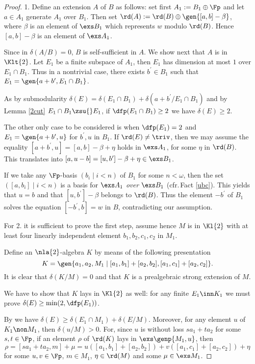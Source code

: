 \begin{proof}
1. Define an extension $A$ of $B$ as follows: set first $A_{1}:=B_{1}\oplus\Fp$ and let $a\in A_{1}$ generate $A_{1}$ over $B_{1}$.
Then set $\rd(A):=\rd(B)\oplus\gen{[a,b]-\beta}$, where
$\beta$ is an element of $\exs B_{1}$ which represents $w$ modulo
$\rd(B)$. Hence $[a,b]-\beta$ is an element of $\exs A_{1}$.

Since in $\delta(A/B)=0$, $B$ is self-sufficient in $A$. We show
next that $A$ is in $\Klt{2}$. Let $E_{1}$ be a finite subspace of $A_{1}$,
then $E_{1}$ has dimension at most $1$ over $E_{1}\cap B_{1}$. Thus in a nontrivial
case, there exists $b^{\prime}\in B_{1}$ such that $E_{1}=\gen{a+b^{\prime},E_{1}\cap B_{1}}$.

As by submodularity  $\delta(E)=\delta(E_{1}\cap B_{1})+\delta(a+b^{\prime}/ E_{1}\cap B_{1})$ and by Lemma \ref{2cut}
$E_{1}\cap B_{1}\zsu{}E_{1}$, if $\dfp(E_{1}\cap B_{1})\geq2$ we have $\delta(E)\geq2$.

The other only case to be considered is when $\dfp(E_{1})=2$ and
$E_{1}=\gen{a+b^{\prime},u}$ for $b^{\prime},u$ in $B_{1}$.
If $\rd(E)\neq\triv$, then we may assume the equality $[a+b^{\prime},u]=[a,b]-\beta+\eta$ holds in $\exs A_{1}$,
for some $\eta$ in $\rd(B)$. This translates into $[a,u-b]=[u,b^{\prime}]-\beta+\eta\in\exs B_{1}$.

If we take any $\Fp$-basis $(b_{i}\mid i<n)$ of $B_{1}$
for some $n<\omega$, then the set $([a,b_{i}]\mid i<n)$ is a basis for
$\exs A_{1}$ {\em over} $\exs B_{1}$ (cfr.\,Fact \ref{ubc}). This yields that $u=b$ and that
$[u,b^{\prime}]-\beta$ belongs to $\rd(B)$. Thus the element $-b^{\prime}$ of $B_{1}$ solves the equation $[-b^{\prime},b]=w$ in $B$, contradicting our assumption.

\medskip
For 2. it is sufficient to prove the first step, assume hence $M$ is in $\Kl{2}$ with
at least four linearly independent element $b_{1},b_{2},c_{1},c_{2}$ in $M_{1}$.

Define an $\nla{2}$-algebra $K$ by means of the following presentation
$$K=\gen{a_{1},a_{2},M_{1}\mid[a_{1},b_{1}]+[a_{2},b_{2}],[a_{1},c_{1}]+[a_{2},c_{2}]}.$$
It is clear that $\delta(K/M)=0$ and that $K$ is a prealgebraic strong extension of $M$.

We have to show that $K$ lays in $\Kl{2}$ as well: for any finite $E_{1}\inn K_{1}$ we must prove
$\delta(E)\geq\min(2,\dfp(E_{1}))$.

By  we have
$\delta(E)\geq\delta(E_{1}\cap M_{1})+\delta(E/M)$. Moreover,
for any element $u$ of $K_{1}\non M_{1}$, then $\delta(u/M)>0$. For, since $u$ is without loss $s a_{1}+t a_{2}$
for some $s,t\in\Fp$, if an element $\rho$ of $\rd(K)$ lays in $\exs\genp{M_{1},u}$, then
$$\rho=[sa_{1}+ta_{2},m]+\mu=
u([a_{1},b_{1}]+[a_{2},b_{2}])+v([a_{1},c_{1}]+[a_{2},c_{2}])+\eta$$
for some $u,v\in\Fp$, $m\in M_{1}$, $\eta\in\rd(M)$ and some $\mu\in\exs M_{1}$.


\end{proof}
